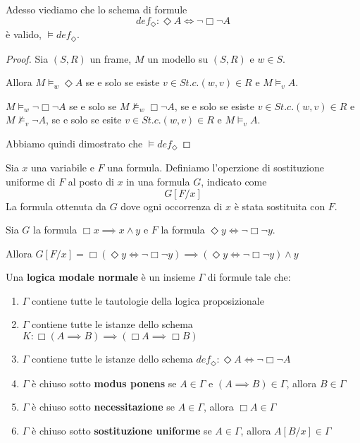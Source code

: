 \documentclass[10pt,a4paper,twoside]{book}
\begin{document}
Adesso viediamo che lo schema di formule
\begin{equation*}
    def_\Diamond : \Diamond A \iff \neg \Box \neg A
\end{equation*}
è valido, $\vDash def_\Diamond$.

\begin{proof}
    Sia $(S,R)$ un frame, $M$ un modello su $(S,R)$ e $w \in S$.

    Allora $M \vDash_w \Diamond A$ se e solo se esiste $v \in S t.c. (w,v) \in R$ e $M \vDash_v A$.

    $M \vDash_w \neg \Box \neg A$ se e solo se $M \nvDash_w \Box \neg A$, se e solo se esiste $v \in S t.c. (w,v) \in R$ e $M \nvDash_v \neg A$, se e solo se esite $v \in S t.c. (w,v) \in R$ e $M \vDash_v A$.

    Abbiamo quindi dimostrato che $\vDash def_\Diamond$
\end{proof}
\begin{definition}
    Sia $x$ una variabile e $F$ una formula. Definiamo l'operzione di sostituzione uniforme di $F$ al posto di $x$ in una formula $G$, indicato come
    \begin{equation*}
        G[F/x]
    \end{equation*}
    La formula ottenuta da $G$ dove ogni occorrenza di $x$ è stata sostituita con $F$.
\end{definition}
\begin{example}
    Sia $G$ la formula $\Box x \implies x \land y$ e $F$ la formula $\Diamond y \iff \neg \Box \neg y$.

    Allora $G[F/x] = \Box (\Diamond y \iff \neg \Box \neg y) \implies (\Diamond y \iff \neg \Box \neg y) \land y$
\end{example}
\begin{definition}
    Una \textbf{logica modale normale} è un insieme $\Gamma$ di formule tale che:
    \begin{enumerate}
        \item $\Gamma$ contiene tutte le tautologie della logica proposizionale
        \item $\Gamma$ contiene tutte le istanze dello schema $K: \Box (A \implies B) \implies (\Box A \implies \Box B)$
        \item $\Gamma$ contiene tutte le istanze dello schema $def_\Diamond : \Diamond A \iff \neg \Box \neg A$
        \item $\Gamma$ è chiuso sotto \textbf{modus ponens} se $A \in \Gamma$ e $(A \implies B) \in \Gamma$, allora $B \in \Gamma$
        \item $\Gamma$ è chiuso sotto \textbf{necessitazione} se $A \in \Gamma$, allora $\Box A \in \Gamma$
        \item $\Gamma$ è chiuso sotto \textbf{sostituzione uniforme} se $A \in \Gamma$, allora $A[B/x] \in \Gamma$
    \end{enumerate}
\end{definition}
\end{document}
